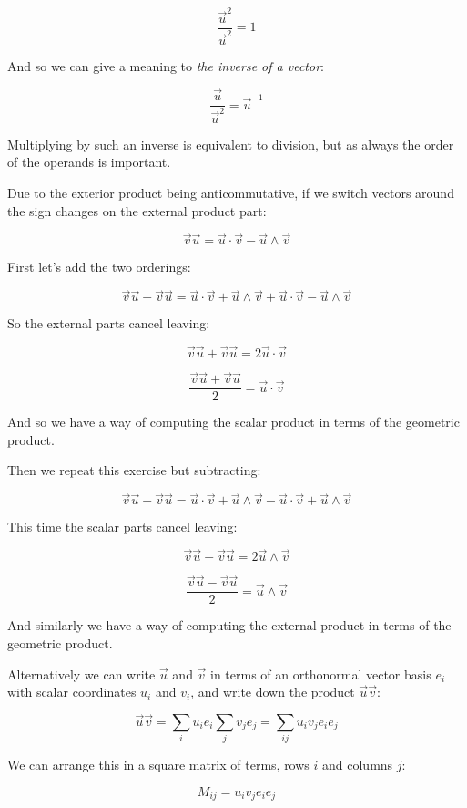 $$\frac{ \vec{u}^2 }{ \vec{u}^2 } = 1$$

And so we can give a meaning to \textit{the inverse of a vector}:

$$\frac{ \vec{u} }{ \vec{u}^2 } = \vec{u}^{-1}$$

Multiplying by such an inverse is equivalent to division, but as always the order of the operands is important.

Due to the exterior product being anticommutative, if we switch vectors around the sign changes on the external product part:

$$
\vec{v}\vec{u}
= \vec{u} \cdot \vec{v} - \vec{u} \wedge \vec{v}
$$

First let's add the two orderings:

$$
\vec{v}\vec{u} + \vec{v}\vec{u}
= \vec{u} \cdot \vec{v} + \vec{u} \wedge \vec{v} + \vec{u} \cdot \vec{v} - \vec{u} \wedge \vec{v}
$$

So the external parts cancel leaving:

$$
\vec{v}\vec{u} + \vec{v}\vec{u}
= 2\vec{u} \cdot \vec{v}
$$

$$
\frac{\vec{v}\vec{u} + \vec{v}\vec{u}} {2}
= \vec{u} \cdot \vec{v}
$$

And so we have a way of computing the scalar product in terms of the geometric product.

Then we repeat this exercise but subtracting:

$$
\vec{v}\vec{u} - \vec{v}\vec{u}
= \vec{u} \cdot \vec{v} + \vec{u} \wedge \vec{v} - \vec{u} \cdot \vec{v} + \vec{u} \wedge \vec{v}
$$

This time the scalar parts cancel leaving:

$$
\vec{v}\vec{u} - \vec{v}\vec{u}
= 2\vec{u} \wedge \vec{v}
$$

$$
\frac{\vec{v}\vec{u} - \vec{v}\vec{u}} {2}
= \vec{u} \wedge \vec{v}
$$

And similarly we have a way of computing the external product in terms of the geometric product.

Alternatively we can write $\vec{u}$ and $\vec{v}$ in terms of an orthonormal vector basis $e_i$ with scalar coordinates $u_i$ and $v_i$, and write down the product $\vec{u}\vec{v}$:

$$
\vec{u}\vec{v} = \sum_i{u_i e_i} \sum_j{v_j e_j}
= \sum_{ij}{u_i v_j e_i e_j}
$$

We can arrange this in a square matrix of terms, rows $i$ and columns $j$:

$$
M_{ij} = {u_i v_j e_i e_j}
$$

